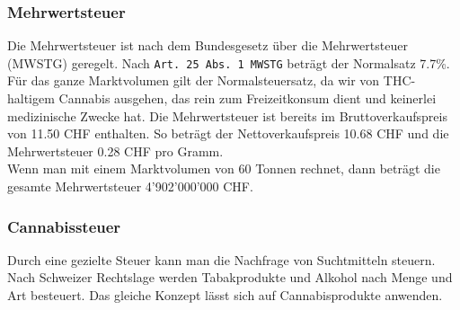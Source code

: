 \documentclass[../main.tex]{subfiles}
\begin{document}
	 \subsubsection{Mehrwertsteuer}
	 Die Mehrwertsteuer ist nach dem Bundesgesetz über die Mehrwertsteuer (MWSTG) geregelt.
	 Nach \texttt{Art. 25 Abs. 1 MWSTG} beträgt der Normalsatz 7.7\%. 
	 Für das ganze Marktvolumen gilt der Normalsteuersatz, da wir von THC-haltigem Cannabis ausgehen, das rein zum Freizeitkonsum dient und keinerlei medizinische Zwecke hat. 
	 Die Mehrwertsteuer ist bereits im Bruttoverkaufspreis von 11.50 CHF enthalten. 
	 So beträgt der Nettoverkaufspreis 10.68 CHF und die Mehrwertsteuer 0.28 CHF pro Gramm. \\
	 
	 \noindent
	 Wenn man mit einem Marktvolumen von 60 Tonnen rechnet, dann beträgt die gesamte Mehrwertsteuer 4’902’000’000 CHF.
	 
	 \subsubsection{Cannabissteuer}
	 Durch eine gezielte Steuer kann man die Nachfrage von Suchtmitteln steuern. Nach Schweizer Rechtslage werden Tabakprodukte und Alkohol nach Menge und Art besteuert. 
	 Das gleiche Konzept lässt sich auf Cannabisprodukte anwenden. 
	 
	 
	 
\end{document}
